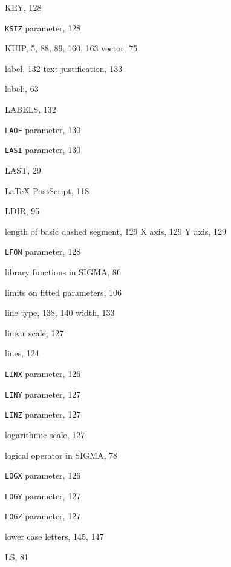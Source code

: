 \begin{theindex}
  \indexspace

  \item {\ttfamily  KEY}, 128
  \item {\tt KSIZ}
     parameter, 128
  \item KUIP, 5, 88, 89, 160, 163
    \subitem vector, 75

  \indexspace

  \item label, 132
    \subitem text justification, 133
  \item {\ttfamily  label:}, 63
  \item {\ttfamily  LABELS}, 132
  \item {\tt LAOF}
     parameter, 130
  \item {\tt LASI}
     parameter, 130
  \item {\ttfamily  LAST}, 29
  \item \LaTeX{}
    \subitem PostScript, 118
  \item {\ttfamily  LDIR}, 95
  \item length of
    \subitem basic dashed segment, 129
    \subitem X axis, 129
    \subitem Y axis, 129
  \item {\tt LFON}
     parameter, 128
  \item library functions in SIGMA, 86
  \item limits on fitted parameters, 106
  \item line
    \subitem type, 138, 140
    \subitem width, 133
  \item linear scale, 127
  \item lines, 124
  \item {\tt LINX}
     parameter, 126
  \item {\tt LINY}
     parameter, 127
  \item {\tt LINZ}
     parameter, 127
  \item logarithmic scale, 127
  \item logical operator in SIGMA, 78
  \item {\tt LOGX}
     parameter, 126
  \item {\tt LOGY}
     parameter, 127
  \item {\tt LOGZ}
     parameter, 127
  \item lower case letters, 145, 147
  \item LS, 81

\end{theindex}
